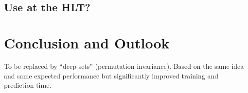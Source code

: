 \subsection{Use at the HLT?}

\cite{ATL-DAQ-PUB-2019-001}


\section{Conclusion and Outlook}


To be replaced by ``deep sets'' (permutation invariance). Based on the
same idea and same expected performance but significantly improved
training and prediction time.

